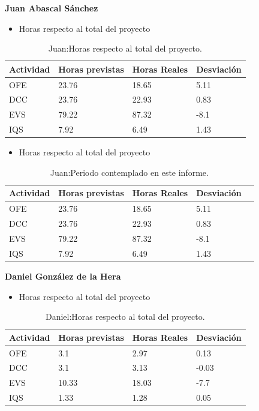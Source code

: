 \textbf{Juan Abascal Sánchez}
\begin{itemize}
\item Horas respecto al total del proyecto
\end{itemize}
\begin{table}[H]
\begin{center}
\begin{tabular}{ l l l l }
  Actividad & Horas previstas & Horas Reales & Desviación \\ \hline \hline
    OFE & 23.76 & 18.65 & 5.11 \\ \hline
    DCC & 23.76 & 22.93 & 0.83 \\ \hline
    EVS & 79.22 & 87.32 & -8.1 \\ \hline
    IQS & 7.92 & 6.49 & 1.43 \\ \hline
\end{tabular}
\caption{Juan:Horas respecto al total del proyecto.}
\label{tab:Juan:HorasTotalInforme}
\end{center}
\end{table}

\begin{itemize}
\item Horas respecto al total del proyecto
\end{itemize}
\begin{table}[H]
\begin{center}
\begin{tabular}{ l l l l l }
  Actividad & Horas previstas & Horas Reales & Desviación \\ \hline \hline
    OFE & 23.76 & 18.65 & 5.11\\ \hline
    DCC & 23.76 & 22.93 & 0.83 \\ \hline
    EVS & 79.22 & 87.32 & -8.1 \\ \hline
    IQS & 7.92 & 6.49 & 1.43 \\ \hline
\end{tabular}
\caption{Juan:Periodo contemplado en este informe.}
\label{tab:Juan:PeriodoContempladoInforme}
\end{center}
\end{table}

\textbf{Daniel González de la Hera}
\begin{itemize}
\item Horas respecto al total del proyecto
\end{itemize}
\begin{table}[H]
\begin{center}
\begin{tabular}{ l l l l }
  Actividad & Horas previstas & Horas Reales & Desviación \\ \hline \hline
  	OFE & 3.1 & 2.97 & 0.13 \\ \hline
  	DCC & 3.1 & 3.13 & -0.03 \\ \hline
  	EVS & 10.33 & 18.03 & -7.7 \\ \hline
  	IQS & 1.33 & 1.28 & 0.05 \\ \hline
\end{tabular}
\caption{Daniel:Horas respecto al total del proyecto.}
\label{tab:Daniel:HorasTotalInforme}
\end{center}
\end{table}

